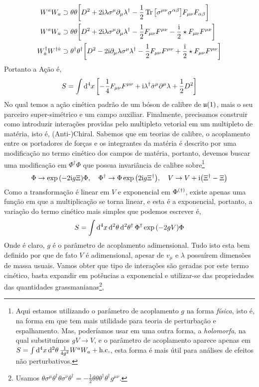 \begin{align*}
    W^aW_a&\supset\theta\theta\qty[ D^2+2\textnormal{i}\lambda\sigma^\mu\partial_\mu\lambda^\dagger-\frac12\Tr\qty[\sigma^{\mu\nu}\sigma^{\alpha\beta}]F_{\mu\nu}F_{\alpha\beta}]\\
    W^aW_a&\supset\theta\theta\qty[ D^2+2\textnormal{i}\lambda\sigma^\mu\partial_\mu\lambda^\dagger-\frac12F_{\mu\nu}F^{\mu\nu}-\frac{\textnormal{i}}2\star F_{\mu\nu}F^{\mu\nu}]\\
    W_{\dot a}^\dagger W^{\dagger \dot a}&\supset\theta^\dagger\theta^\dagger\qty[ D^2-2\textnormal{i}\partial_\mu\lambda\sigma^\mu\lambda^\dagger-\frac12F_{\mu\nu}F^{\mu\nu}+\frac{\textnormal{i}}2\star F_{\mu\nu}F^{\mu\nu}]\\
\end{align*}
Portanto a Ação é,
\[S=\int\dd[4]{x}\qty[-\frac14 F_{\mu\nu}F^{\mu\nu}+\textnormal{i}\lambda^\dagger{\bar\sigma}^\mu\partial^\mu\lambda+\frac12 D^2]\] No qual temos a ação cinética padrão de um bóson de calibre de $\mathfrak u\qty(1)$, mais o seu parceiro super-simétrico e um 
campo auxiliar. Finalmente, precisamos construir como introduzir interações providas pelo multipleto vetorial em um multipleto de matéria, isto é, (Anti-)Chiral. Sabemos que em teorias de 
calibre, o acoplamento entre os portadores de forças e os integrantes da matéria é descrito por uma modificação no termo cinético dos campos de matéria, portanto, devemos buscar uma modificação em $\Phi^\dagger \Phi$ que 
possua invariância de calibre sobre\footnote{Aqui estamos utilizando o parâmetro de acoplamento $g$ na forma \textit{física}, isto é, na forma em que tem mais utilidade para teoria de perturbação e espalhamento. Mas, poderíamos usar em uma outra forma, a \textit{holomorfa}, na qual substituímos $gV\rightarrow V$, e o parâmetro de acoplamento aparece apenas em $S=\int\dd[4]{x}\dd[2]{\theta}\frac{1}{4g^2}W^aW_a+\textnormal{h.c.}$, esta forma é mais útil para análises de efeitos não perturbativos.} \[\Phi\rightarrow\exp\qty(-2\im g\Xi)\Phi,\ \ \ \Phi^\dagger\rightarrow\Phi\exp\qty(2\im g\Xi^\dagger),\ \ \ V\rightarrow V+\im\qty(\Xi^\dagger-\Xi)\] Como a transformação é linear em $V$ e exponencial em $\Phi^{\qty(\dagger)}$, 
existe apenas uma função em que a multiplicação se torna linear, e esta é a exponencial, portanto, a variação do termo cinético mais simples que podemos escrever é,\[S=\int\dd[4]{x}\dd[2]{\theta}\dd[2]{\theta^\dagger}\Phi^\dagger\exp\qty(-2g V)\Phi\] Onde é claro, $g$ é o parâmetro de acoplamento adimensional. Tudo isto esta bem definido por que de fato 
$V$ é adimensional, apesar de $v_\mu$ e $\lambda$ possuírem dimensões de massa usuais. Vamos obter que tipo de interações são geradas por este termo cinético, basta expandir em potências a exponencial e utilizar-se das propriedades das quantidades grassmanianas\footnote{Usamos $\theta\sigma^\mu\theta^\dagger\theta\sigma^\nu\theta^\dagger=-\frac12\theta\theta\theta^\dagger\theta^\dagger g^{\mu\nu}$.},
